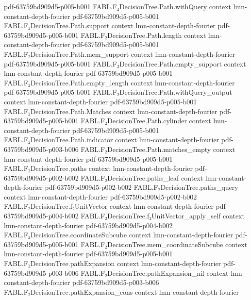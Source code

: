 \begin{theorem}
  {pdf-63759bd909d5-p005-b001}
\proofstep
  {FABL.F₂DecisionTree.Path.withQuery}
  {context}
  {lmn-constant-depth-fourier}
  {pdf-63759bd909d5-p005-b001}
\proofstep
  {FABL.F₂DecisionTree.Path.support}
  {context}
  {lmn-constant-depth-fourier}
  {pdf-63759bd909d5-p005-b001}
\proofstep
  {FABL.F₂DecisionTree.Path.length}
  {context}
  {lmn-constant-depth-fourier}
  {pdf-63759bd909d5-p005-b001}
\proofstep
  {FABL.F₂DecisionTree.Path.mem_support}
  {context}
  {lmn-constant-depth-fourier}
  {pdf-63759bd909d5-p005-b001}
\proofstep
  {FABL.F₂DecisionTree.Path.empty_support}
  {context}
  {lmn-constant-depth-fourier}
  {pdf-63759bd909d5-p005-b001}
\proofstep
  {FABL.F₂DecisionTree.Path.empty_length}
  {context}
  {lmn-constant-depth-fourier}
  {pdf-63759bd909d5-p005-b001}
\proofstep
  {FABL.F₂DecisionTree.Path.withQuery_output}
  {context}
  {lmn-constant-depth-fourier}
  {pdf-63759bd909d5-p005-b001}
\proofstep
  {FABL.F₂DecisionTree.Path.Matches}
  {context}
  {lmn-constant-depth-fourier}
  {pdf-63759bd909d5-p005-b001}
\proofstep
  {FABL.F₂DecisionTree.Path.cylinder}
  {context}
  {lmn-constant-depth-fourier}
  {pdf-63759bd909d5-p005-b001}
\proofstep
  {FABL.F₂DecisionTree.Path.indicator}
  {context}
  {lmn-constant-depth-fourier}
  {pdf-63759bd909d5-p003-b006}
\proofstep
  {FABL.F₂DecisionTree.Path.matches_empty}
  {context}
  {lmn-constant-depth-fourier}
  {pdf-63759bd909d5-p005-b001}
\proofstep
  {FABL.F₂DecisionTree.paths}
  {context}
  {lmn-constant-depth-fourier}
  {pdf-63759bd909d5-p002-b002}
\proofstep
  {FABL.F₂DecisionTree.paths_leaf}
  {context}
  {lmn-constant-depth-fourier}
  {pdf-63759bd909d5-p002-b002}
\proofstep
  {FABL.F₂DecisionTree.paths_query}
  {context}
  {lmn-constant-depth-fourier}
  {pdf-63759bd909d5-p002-b002}
\proofstep
  {FABL.F₂DecisionTree.f₂UnitVector}
  {context}
  {lmn-constant-depth-fourier}
  {pdf-63759bd909d5-p004-b002}
\proofstep
  {FABL.F₂DecisionTree.f₂UnitVector_apply_self}
  {context}
  {lmn-constant-depth-fourier}
  {pdf-63759bd909d5-p004-b002}
\proofstep
  {FABL.F₂DecisionTree.coordinateSubcube}
  {context}
  {lmn-constant-depth-fourier}
  {pdf-63759bd909d5-p005-b001}
\proofstep
  {FABL.F₂DecisionTree.mem_coordinateSubcube}
  {context}
  {lmn-constant-depth-fourier}
  {pdf-63759bd909d5-p005-b001}
\proofstep
  {FABL.F₂DecisionTree.pathExpansion}
  {context}
  {lmn-constant-depth-fourier}
  {pdf-63759bd909d5-p003-b006}
\proofstep
  {FABL.F₂DecisionTree.pathExpansion_nil}
  {context}
  {lmn-constant-depth-fourier}
  {pdf-63759bd909d5-p003-b006}
\proofstep
  {FABL.F₂DecisionTree.pathExpansion_cons}
  {context}
  {lmn-constant-depth-fourier}

\end{theorem}
